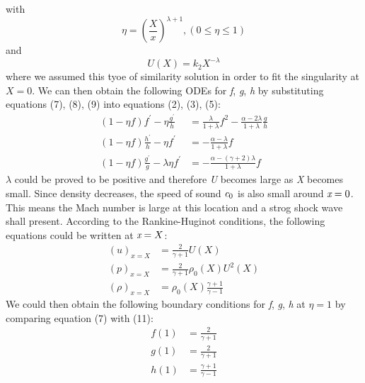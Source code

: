 \documentclass{article}
\begin{document}
with
\begin{equation}
\eta = (\frac{X}{x})^{\lambda+1}, (0\leqslant \eta \leqslant 1)
\end{equation}
and
\begin{equation}
U(X) = k_2X^{-\lambda}
\end{equation}
\newpage
where we assumed this tyoe of similarity solution in order to fit the singularity at $X = 0$. We can then obtain the following ODEs for \textit{f}, \textit{g}, \textit{h} by substituting equations (7), (8), (9) into equations (2), (3), (5):
\begin{equation}
    \begin{split}
        (1-\eta f)f^{'}-\eta \frac{g^{'}}{h} &= \frac{\lambda}{1+\lambda}f^{2}-\frac{\alpha-2\lambda}{1+\lambda}\frac{g}{h}\\
        (1-\eta f)\frac{h^{'}}{h}-\eta f^{'} &= -\frac{\alpha-\lambda}{1+\lambda}f\\
        (1-\eta f)\frac{g^{'}}{g}-\lambda\eta f^{'} &= -\frac{\alpha-(\gamma+2)\lambda}{1+\lambda}f
    \end{split}
\end{equation}
$\lambda$ could be proved to be positive and therefore \textit{U} becomes large as \textit{X} becomes small. Since density decreases, the speed of sound $\textit c_0$ is also small around $\textit x=0$. This means the Mach number is large at this location and a strog shock wave shall present. According to the Rankine-Huginot conditions, the following equations could be written at $\textit x=X$:
\begin{equation}
    \begin{split}
        (u)_{x=X} &= \frac{2}{\gamma+1}U(X) \\
        (p)_{x=X} &= \frac{2}{\gamma+1}\rho_{0}(X)U^{2}(X) \\
        (\rho)_{x=X} &= \rho_{0}(X)\frac{\gamma+1}{\gamma-1}
    \end{split}
\end{equation}
We could then obtain the following boundary conditions for \textit{f}, \textit{g}, \textit{h} at $\eta=1$ by comparing equation (7) with (11):
\begin{equation}
    \begin{split}
        f(1) &= \frac{2}{\gamma+1} \\
        g(1) &= \frac{2}{\gamma+1} \\
        h(1) &= \frac{\gamma+1}{\gamma-1}
    \end{split}
\end{equation}
\end{document}
